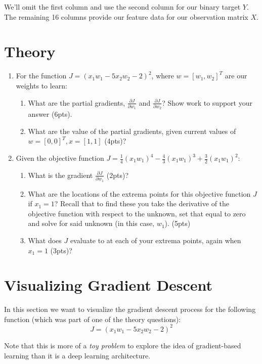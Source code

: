 \documentclass[12pt]{article}
\begin{document}
\noindent
We'll omit the first column and use the second column for our binary target $Y$.  The remaining 16 columns provide our feature data for our observation matrix $X$.

\newpage
\section{Theory}
\begin{enumerate}
\item For the function $J=(x_1 w_1 -5x_2 w_2-2)^2$, where $w=[w_1, w_2]^T$ are our weights to learn:
\begin{enumerate}
\item What are the partial gradients, $\frac{\partial J}{\partial w_1}$ and $\frac{\partial J}{\partial w_2}$?  Show work to support your answer (6pts).
\item What are the value of the partial gradients, given current values of $w=[0, 0]^T, x=[1, 1]$ (4pts)?
\end{enumerate}

\item Given the objective function $J=\frac{1}{4}(x_1 w_1)^4-\frac{4}{3}(x_1 w_1)^3+\frac{3}{2}(x_1 w_1)^2$:
\begin{enumerate}
\item What is the gradient $\frac{\partial J}{\partial w_1}$ (2pts)?
\item What are the locations of the extrema points for this objective function $J$ if $x_1=1$?  Recall that to find these you take the derivative of the objective function with respect to the unknown, set that equal to zero and solve for said unknown (in this case, $w_1$). (5pts)
\item What does $J$ evaluate to at each of your extrema points, again when $x_1=1$ (3pts)?
\end{enumerate}
\end{enumerate}

\newpage
\section{Visualizing Gradient Descent}
In this section we want to visualize the gradient descent process for the following function (which was part of one of the theory questions):
$$J=(x_1 w_1 -5x_2 w_2-2)^2$$

\noindent
Note that this is more of a \emph{toy problem} to explore the idea of gradient-based learning than it is a deep learning architecture.\\
\end{document}
